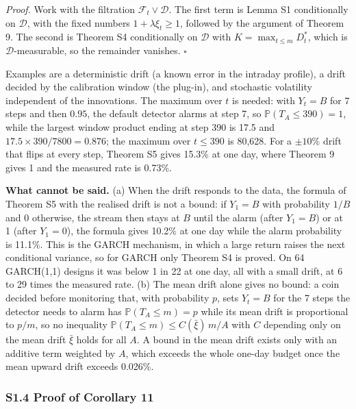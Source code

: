 \documentclass[
]{article}
\begin{document}
\emph{Proof.} Work with the filtration
\(\mathcal{F}_t \vee \mathcal{D}\). The first term is Lemma S1
conditionally on \(\mathcal{D}\), with the fixed numbers
\(1 + \lambda\xi_t \ge 1\), followed by the argument of Theorem 9. The
second is Theorem S4 conditionally on \(\mathcal{D}\) with
\(K = \max_{t \le m} D_t^\ast\), which is \(\mathcal{D}\)-measurable, so
the remainder vanishes. \(\square\)

Examples are a deterministic drift (a known error in the intraday
profile), a drift decided by the calibration window (the plug-in), and
stochastic volatility independent of the innovations. The maximum over
\(t\) is needed: with \(Y_t = B\) for 7 steps and then \(0.95\), the
default detector alarms at step 7, so \(\mathbb{P}(T_A \le 390) = 1\),
while the largest window product ending at step 390 is 17.5 and
\(17.5 \times 390/7800 = 0.876\); the maximum over \(t \le 390\) is
80,628. For a \(\pm 10\%\) drift that flips at every step, Theorem S5
gives 15.3\% at one day, where Theorem 9 gives 1 and the measured rate
is 0.73\%.

\textbf{What cannot be said.} (a) When the drift responds to the data,
the formula of Theorem S5 with the realised drift is not a bound: if
\(Y_1 = B\) with probability \(1/B\) and 0 otherwise, the stream then
stays at \(B\) until the alarm (after \(Y_1 = B\)) or at 1 (after
\(Y_1 = 0\)), the formula gives 10.2\% at one day while the alarm
probability is 11.1\%. This is the GARCH mechanism, in which a large
return raises the next conditional variance, so for GARCH only Theorem
S4 is proved. On 64 GARCH(1,1) designs it was below 1 in 22 at one day,
all with a small drift, at 6 to 29 times the measured rate. (b) The mean
drift alone gives no bound: a coin decided before monitoring that, with
probability \(p\), sets \(Y_t = B\) for the 7 steps the detector needs
to alarm has \(\mathbb{P}(T_A \le m) = p\) while its mean drift is
proportional to \(p/m\), so no inequality
\(\mathbb{P}(T_A \le m) \le C(\bar\xi)\,m/A\) with \(C\) depending only
on the mean drift \(\bar\xi\) holds for all \(A\). A bound in the mean
drift exists only with an additive term weighted by \(A\), which exceeds
the whole one-day budget once the mean upward drift exceeds 0.026\%.

\hypertarget{s1.4-proof-of-corollary-11}{%
\subsubsection{S1.4 Proof of Corollary
11}\label{s1.4-proof-of-corollary-11}}
\end{document}
